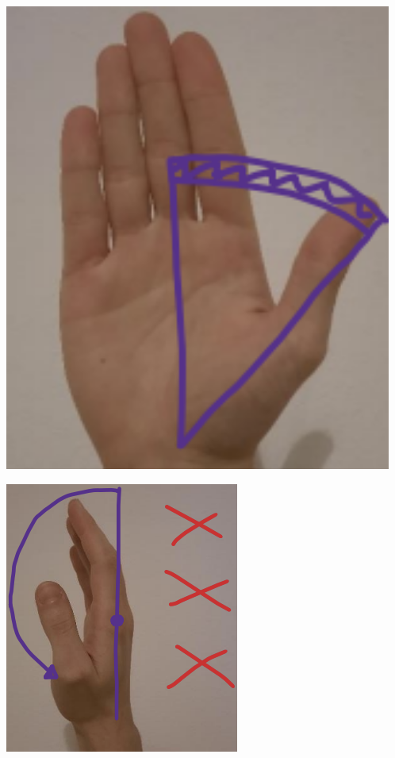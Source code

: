 \vspace{+ 15 px}
\begin{multicols}{2}
    \begin{multicolfigure}
        \centering
        \includegraphics[width=0.956\textwidth]{images/pollici_1.png}
    \end{multicolfigure}
    \columnbreak
    \begin{multicolfigure}
        \centering
        \includegraphics[width=\textwidth]{images/pollici_2.png}

\end{multicolfigure}
\end{multicols}
